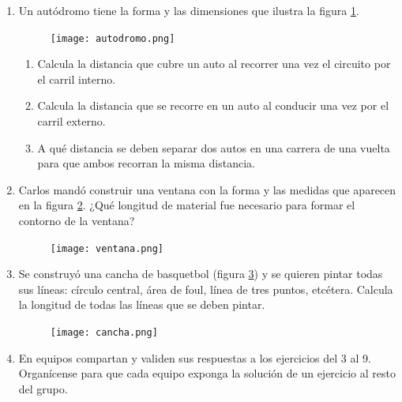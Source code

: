 \documentclass[11pt]{book}
\begin{document}
\begin{enumerate}
  \item Un autódromo tiene la forma y las dimensiones que ilustra la figura \ref{fig:autodromo}.
        \begin{figure}[H]
          \centering
          \texttt{[image: autodromo.png]}
          \label{fig:autodromo}
        \end{figure}
        \begin{enumerate}
          \item Calcula la distancia que cubre un auto al recorrer una vez el circuito por el carril interno.\\
          \item Calcula la distancia que se recorre en un auto al conducir una vez por el carril externo.\\
          \item A qué distancia se deben separar dos autos en una carrera de una vuelta para que ambos recorran la misma distancia.
        \end{enumerate}
  \item Carlos mandó construir una ventana con la forma y las medidas que aparecen en
        la figura \ref{fig:ventana}. ¿Qué longitud de material fue necesario para formar el contorno de la ventana?

        \begin{figure}[H]
          \centering
          \texttt{[image: ventana.png]}
          \label{fig:ventana}
        \end{figure}
        \newpage
  \item Se construyó una cancha de basquetbol (figura \ref{fig:cancha}) y se quieren pintar todas sus
        líneas: círculo central, área de foul, línea de tres puntos, etcétera. Calcula la longitud de todas las líneas que se deben pintar.
        \begin{figure}[H]
          \centering
          \texttt{[image: cancha.png]}
          \label{fig:cancha}
        \end{figure}

  \item En equipos compartan y validen sus respuestas a los ejercicios del 3 al 9. Organícense
        para que cada equipo exponga la solución de un ejercicio al resto del grupo.
\end{enumerate}
\end{document}
